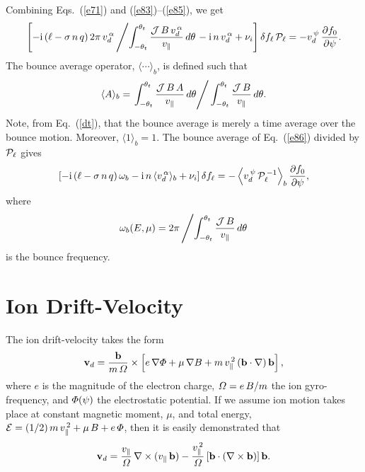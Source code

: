 \documentclass[12pt,prb,aps,notitlepage]{revtex4-1}
\begin{document}
 Combining Eqs.~(\ref{e71}) and (\ref{e83})--(\ref{e85}), we get 
 \begin{equation}\label{e86}
 \left[-{\rm i}\,(\ell-\sigma\,n\,q)\,2\pi\,v_d^{\,\alpha}\left/\int_{-\theta_t}^{\theta_t}\frac{{\cal J}\,B\,v_d^{\,\alpha}}{v_\parallel}\,d\theta\right.-
 {\rm i}\,n\,v_d^{\,\alpha}+\nu_i\right]\delta f_{\ell}\,{\cal P}_{\ell} = - v_d^{\,\psi}\,\frac{\partial f_0}{\partial\psi}.
 \end{equation}
 The bounce average operator, $\langle \cdots\rangle_b$, is defined such that
 \begin{equation}\label{bounce}
 \langle A\rangle_b =\left.\int_{-\theta_t}^{\theta_t}\frac{{\cal J}\,B\,A}{v_\parallel}\,d\theta\right/ \int_{-\theta_t}^{\theta_t}\frac{{\cal J}\,B}{v_\parallel}\,d\theta.
 \end{equation}
 Note, from Eq.~(\ref{dt}), that the bounce average is merely a time average over the bounce motion.  Moreover,  $\langle 1\rangle_b =1$. 
 The bounce average of Eq.~(\ref{e86}) divided by ${\cal P}_{\ell}$ gives
 \begin{equation}\label{e91}
 \left[-{\rm i}\,(\ell-\sigma\,n\,q)\,\omega_b -{\rm i}\,n\,\langle v_d^{\,\alpha}\rangle_b+\nu_i\right]\delta f_{\ell} = -
 \left\langle v_d^{\,\psi}\,{\cal P}_{\ell}^{\,-1}\right\rangle_b\frac{\partial f_0}{\partial\psi},
 \end{equation}
 where
 \begin{equation}
 \omega_b(E,\mu) = 2\pi\left/\int_{-\theta_t}^{\theta_t}\frac{{\cal J}\,B}{v_\parallel}\,d\theta\right.
 \end{equation}
 is the bounce frequency. 
 
\section{Ion Drift-Velocity}
The ion drift-velocity takes the form
\begin{equation}
{\bf v}_d =\frac{{\bf b}}{m\,{\mit\Omega}}\times\left[e\,\nabla{\mit\Phi}+ \mu\,\nabla B + m\,v_\parallel^{\,2}\,({\bf b}\cdot\nabla)\,{\bf b}\right],
\end{equation}
where $e$ is the magnitude of the electron charge, ${\mit\Omega}=e\,B/m$  the ion gyro-frequency, and ${\mit\Phi}(\psi)$  the
electrostatic potential. If we assume ion motion takes place at constant magnetic moment, $\mu$, and total energy,
 ${\cal E}= (1/2)\,m\,v_\parallel^{\,2}+ \mu\,B+e\,{\mit\Phi}$, then it is easily
 demonstrated that
 \begin{equation}
 {\bf v}_d = \frac{v_\parallel}{{\mit\Omega}}\,\nabla\times (v_\parallel\,{\bf b}) - \frac{v_\parallel^{\,2}}{{\mit\Omega}}\,[{\bf b}\cdot(\nabla\times {\bf b})]\,{\bf b}.
 \end{equation}
 
\end{document}
